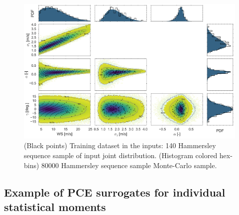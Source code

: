 \documentclass[preprint,12pt]{elsarticle}
\begin{document}
\begin{figure}[h!]
\begin{centering}
\includegraphics[width=\linewidth]{Figures/PCE_train_x_full.jpg}
\caption{(Black points) Training dataset in the inputs: 140 Hammersley sequence sample of input joint distribution. (Histogram colored hex-bins) 80000 Hammersley sequence sample Monte-Carlo sample.}
\label{fig_PCE_train_x_full}
\end{centering}
\end{figure}

\subsection{Example of PCE surrogates for individual statistical moments}
\end{document}
